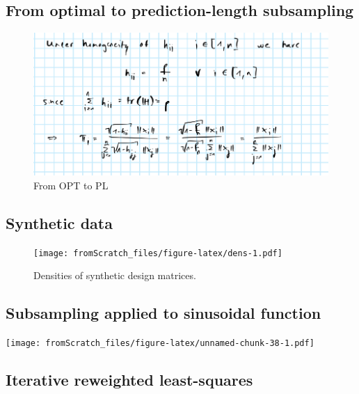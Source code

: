\documentclass[
]{book}
\begin{document}
\hypertarget{app-pl}{%
\subsection*{From optimal to prediction-length subsampling}\label{app-pl}}

\begin{figure}
\centering
\includegraphics{www/PL.png}
\caption{From OPT to PL}
\end{figure}

\hypertarget{app-dens}{%
\subsection*{Synthetic data}\label{app-dens}}

\begin{figure}
\centering
\texttt{[image: fromScratch\_files/figure-latex/dens-1.pdf]}
\caption{\label{fig:dens}Densities of synthetic design matrices.}
\end{figure}

\hypertarget{app-sin}{%
\subsection*{Subsampling applied to sinusoidal function}\label{app-sin}}

\texttt{[image: fromScratch\_files/figure-latex/unnamed-chunk-38-1.pdf]}

\hypertarget{irls}{%
\subsection*{Iterative reweighted least-squares}\label{irls}}
\end{document}
